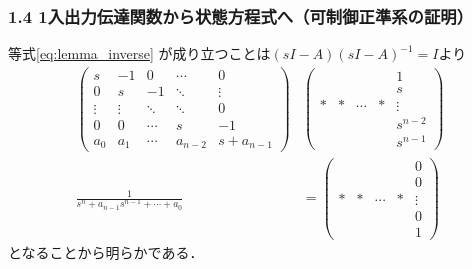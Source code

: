 \begin{frame}[t]
\frametitle{1.4 1入出力伝達関数から状態方程式へ{\small （可制御正準系の証明）}}
等式\eqref{eq:lemma_inverse} が成り立つことは$(sI-A)(sI-A)^{-1}=I$より
\begin{align}
    \left(\begin{array}{ccccc}
     s      & -1     &  0     & \cdots &  0 \\
	 0      &  s     & -1     & \ddots &  \vdots \\
	 \vdots & \vdots & \ddots & \ddots &  0 \\
	 0      &  0     & \cdots & s      & -1 \\
	 a_0    &  a_1   & \cdots & a_{n-2}  &  s+a_{n-1}
	\end{array}\right)
  &
    \left(\begin{array}{ccccc}
        &    &        &    &  1 \\
	    &    &        &    &  s \\
	  * &  * & \cdots &  * &  \vdots \\
	    &    &        &    &  s^{n-2} \\
	    &    &        &    &  s^{n-1}
	\end{array}\right) \nonumber \\
    \frac{1}{s^n + a_{n-1} s^{n-1}  + \cdots + a_0}
 &=
    \left(\begin{array}{ccccc}
        &    &        &    &  0 \\
	    &    &        &    &  0 \\
	  * &  * & \cdots &  * &  \vdots \\
	    &    &        &    &  0 \\
	    &    &        &    &  1
	\end{array}\right)
\end{align}
となることから明らかである．
\end{frame}

